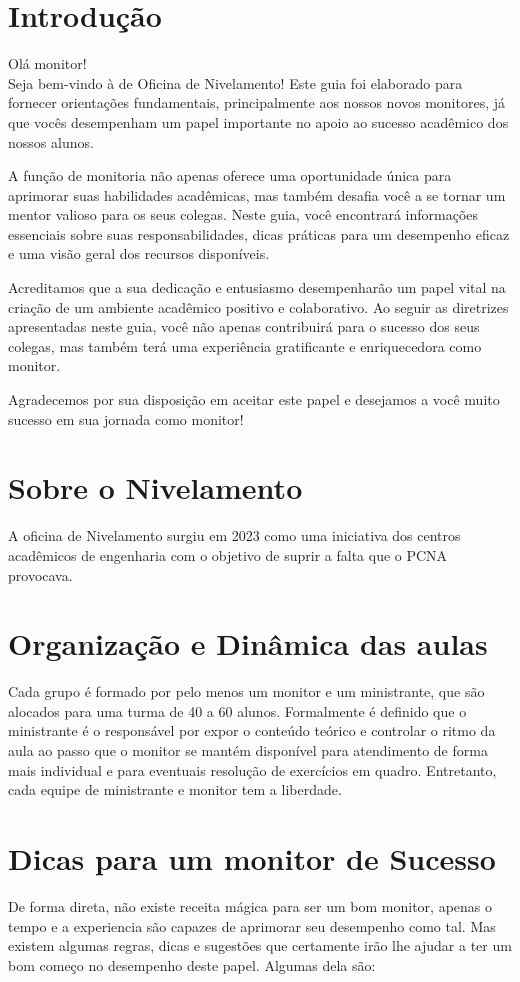 \section{Introdução}
Olá monitor! \\

Seja bem-vindo à de Oficina de Nivelamento! Este guia foi elaborado para fornecer orientações fundamentais, principalmente aos nossos novos monitores, já que vocês desempenham um papel importante no apoio ao sucesso acadêmico dos nossos alunos.

A função de monitoria não apenas oferece uma oportunidade única para aprimorar suas habilidades acadêmicas, mas também desafia você a se tornar um mentor valioso para os seus colegas. Neste guia, você encontrará informações essenciais sobre suas responsabilidades, dicas práticas para um desempenho eficaz e uma visão geral dos recursos disponíveis.

Acreditamos que a sua dedicação e entusiasmo desempenharão um papel vital na criação de um ambiente acadêmico positivo e colaborativo. Ao seguir as diretrizes apresentadas neste guia, você não apenas contribuirá para o sucesso dos seus colegas, mas também terá uma experiência gratificante e enriquecedora como monitor.

Agradecemos por sua disposição em aceitar este papel e desejamos a você muito sucesso em sua jornada como monitor!

\section{Sobre o Nivelamento}
A oficina de Nivelamento surgiu em 2023 como uma iniciativa dos centros acadêmicos de engenharia com o objetivo de suprir a falta que o PCNA provocava.

\section{Organização e Dinâmica das aulas}
Cada grupo é formado por pelo menos um monitor e um ministrante, que são alocados para uma turma de 40 a 60 alunos. Formalmente é definido que o ministrante é o responsável por expor o conteúdo teórico e controlar o ritmo da aula ao passo que o monitor se mantém disponível para atendimento de forma mais individual e para eventuais resolução de exercícios em quadro. Entretanto, cada equipe de ministrante e monitor tem a liberdade.

\newpage
\section{Dicas para um monitor de Sucesso}
De forma direta, não existe receita mágica para ser um bom monitor, apenas o tempo e a experiencia são capazes de aprimorar seu desempenho como tal. Mas existem algumas regras, dicas e sugestões que certamente irão lhe ajudar a ter um bom começo no desempenho deste papel. Algumas dela são:



